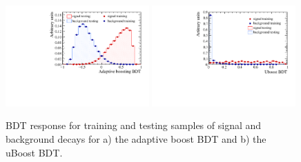\begin{figure}[htbp]
   \centering
        \includegraphics[width=0.49\textwidth]{./Figs/Appendix2/Overtainting_BDT.pdf}
        \includegraphics[width=0.49\textwidth]{./Figs/Appendix2/uBoost_overtraining.pdf}

    \caption{BDT response for training and testing samples of signal and background decays for a) the adaptive boost BDT and b) the uBoost BDT. }
    \label{fig:ELBDTovertrain}
\end{figure}






